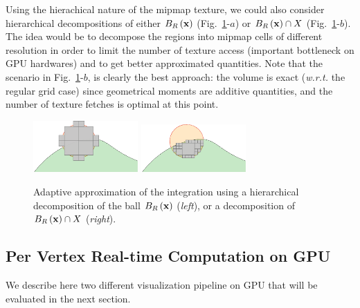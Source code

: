 \documentclass{llncs}
\newcommand{\wrt}{\emph{w.r.t.} }
\begin{document}
Using the hierachical nature of the mipmap texture, we could also
consider hierarchical decompositions of either $B_{R}\left(\mathbf{x}\right)$
(Fig.~\ref{fig:approx2}-$a$) or $B_{R}\left(\mathbf{x}\right)\cap X$
(Fig.~\ref{fig:approx2}-$b$). The idea would be to decompose the
regions into mipmap cells of different resolution in order to limit
the number of texture access (important bottleneck on GPU hardwares)
and to get better approximated quantities. Note that the scenario in
Fig.~\ref{fig:approx2}-$b$, is clearly the best approach: the
volume is exact  (\wrt the regular grid case) since geometrical moments
are additive quantities, and the number of texture fetches is  optimal
at this point.


\begin{figure}
  \begin{center}
    {\includegraphics[width=4cm]{figs/approx-bh}}
    {\includegraphics[width=4cm]{figs/approx-ada}}
  \end{center}
  \caption{Adaptive approximation of the integration using a
    hierarchical decomposition of the ball $B_{R}\left(\mathbf{x}\right)$ (\emph{left}), or a decomposition of $B_{R}\left(\mathbf{x}\right)\cap X$ (\emph{right}).}
  \label{fig:approx2}
\end{figure}


\subsection{Per Vertex Real-time Computation on GPU}
\label{sec:hierarchical}

We describe here two different visualization pipeline on GPU that will
be evaluated in the next section.
\end{document}
